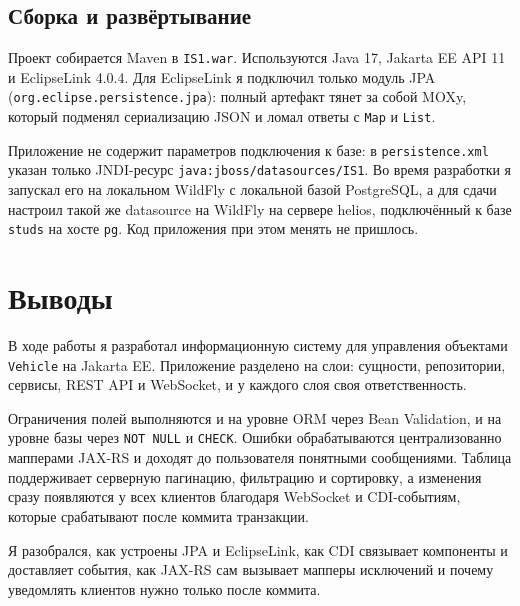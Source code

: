 \documentclass[a4paper,12pt]{article}
\begin{document}
\subsection{Сборка и развёртывание}

Проект собирается Maven в \texttt{IS1.war}. Используются Java 17, Jakarta EE API 11 и EclipseLink 4.0.4. Для EclipseLink я подключил только модуль JPA (\texttt{org.eclipse.persistence.jpa}): полный артефакт тянет за собой MOXy, который подменял сериализацию JSON и ломал ответы с \texttt{Map} и \texttt{List}.

Приложение не содержит параметров подключения к базе: в \texttt{persistence.xml} указан только JNDI-ресурс \texttt{java:\allowbreak jboss/\allowbreak datasources/\allowbreak IS1}. Во время разработки я запускал его на локальном WildFly с локальной базой PostgreSQL, а для сдачи настроил такой же datasource на WildFly на сервере helios, подключённый к базе \texttt{studs} на хосте \texttt{pg}. Код приложения при этом менять не пришлось.

\newpage
\section{Выводы}

В ходе работы я разработал информационную систему для управления объектами \texttt{Vehicle} на Jakarta EE. Приложение разделено на слои: сущности, репозитории, сервисы, REST API и WebSocket, и у каждого слоя своя ответственность.

Ограничения полей выполняются и на уровне ORM через Bean Validation, и на уровне базы через \texttt{NOT NULL} и \texttt{CHECK}. Ошибки обрабатываются централизованно мапперами JAX-RS и доходят до пользователя понятными сообщениями. Таблица поддерживает серверную пагинацию, фильтрацию и сортировку, а изменения сразу появляются у всех клиентов благодаря WebSocket и CDI-событиям, которые срабатывают после коммита транзакции.

Я разобрался, как устроены JPA и EclipseLink, как CDI связывает компоненты и доставляет события, как JAX-RS сам вызывает мапперы исключений и почему уведомлять клиентов нужно только после коммита.
\end{document}
